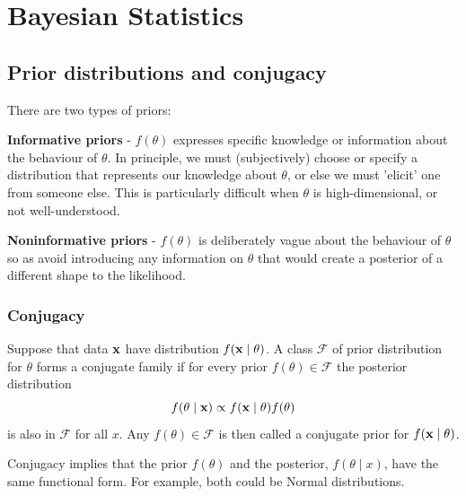 \documentclass[10pt, a4paper]{article}
\begin{document}
\newpage

\section{Bayesian Statistics}

\subsection{Prior distributions and conjugacy}

There are two types of priors:

\textbf{Informative priors} -
$f(\theta)$ expresses specific knowledge or information about the behaviour of $\theta$.
In principle,
we must
(subjectively)
choose or specify a distribution that represents our knowledge about $\theta$,
or else we must
'elicit'
one from someone else.
This is particularly difficult when $\theta$ is high-dimensional,
or not well-understood.

\textbf{Noninformative priors} -
$f(\theta)$ is deliberately vague about the behaviour of $\theta$ so as avoid introducing any information on $\theta$ that would create a posterior of a different shape to the likelihood.

\subsubsection{Conjugacy}

\begin{definition}
    Suppose that data $\mathbf{x}$ have distribution $f(\mathbf{x}\mid \theta)$.
    A class $\mathcal{F}$ of prior distribution for $\theta$ forms a conjugate family if for every prior $f(\theta) \in \mathcal{F}$ the posterior distribution
    \[
    f(\theta \mid \mathbf{x}) \propto f(\mathbf{x}\mid \theta)f(\theta)
    \]
    is also in $\mathcal{F}$ for all $x$.
    Any $f(\theta) \in \mathcal{F}$ is then called a conjugate prior for $f(\mathbf{x} \mid \theta)$.
\end{definition}

Conjugacy implies that the prior $f(\theta)$ and the posterior,
$f(\theta \mid x)$,
have the same functional form.
For example,
both could be Normal distributions.
\end{document}
